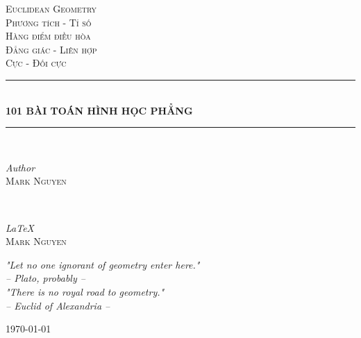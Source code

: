 \documentclass{article}
\begin{document}
    \begin{titlepage}

        \newcommand{\HRule}{\rule{\linewidth}{0.5mm}} 
        \center
        
        
        \textsc{\LARGE Euclidean Geometry}\\[1.5cm] 
        \textsc{\Large Phương tích - Tỉ số}\\[0.5cm] 
        \textsc{\Large Hàng điểm điều hòa}\\[0.5cm] 
        \textsc{\Large Đẳng giác - Liên hợp}\\[0.5cm] 
        \textsc{\Large Cực - Đối cực}\\[1.5cm]
        
        
        \HRule\\[0.4cm]
        
        {\huge\bfseries 101 BÀI TOÁN HÌNH HỌC PHẲNG}\\[0.1cm]
        
        \HRule\\[1.5cm]
        
        
        \begin{minipage}{0.4\textwidth}
            \begin{flushleft}
                \large
                \textit{Author}\\
                \textsc{Mark Nguyen}
            \end{flushleft}
        \end{minipage}
        ~
        \begin{minipage}{0.4\textwidth}
            \begin{flushright}
                \large
                \textit{\LaTeX}\\
                \textsc{Mark Nguyen}
            \end{flushright}
        \end{minipage}
        

        \vfill\vfill

        \textit{"Let no one ignorant of geometry enter here."}\\[0.25cm]
        \textit{-- Plato, probably --}\\[0.75cm]

        \textit{"There is no royal road to geometry."}\\[0.25cm]
        \textit{-- Euclid of Alexandria --}
        
        
        \vfill\vfill\vfill
        {\large\today}

        \vfill
        
    \end{titlepage}
\end{document}
